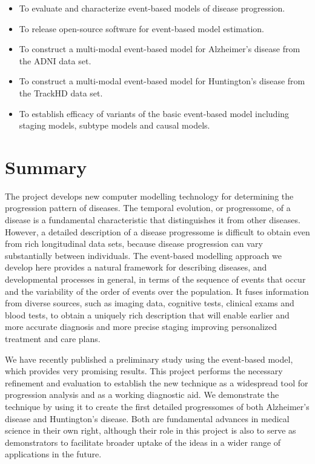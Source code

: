 \documentclass[a4paper,11pt]{article}
\begin{document}
\begin{itemize}

\item To evaluate and characterize event-based models of disease
progression.

\item To release open-source software for event-based model estimation.

\item To construct a multi-modal event-based model for
Alzheimer's disease from the ADNI data set.

\item To construct a multi-modal event-based model for
Huntington's disease from the TrackHD data set.

\item To establish efficacy of variants of the basic event-based model
including staging models, subtype models and causal models.

\end{itemize}


\section*{Summary}

The project develops new computer modelling technology for determining
the progression pattern of diseases.  The temporal evolution, or
progressome, of a disease is a fundamental characteristic that
distinguishes it from other diseases.  However, a detailed description
of a disease progressome is difficult to obtain even from rich
longitudinal data sets, because disease progression can vary
substantially between individuals.  The event-based modelling approach
we develop here provides a natural framework for describing diseases,
and developmental processes in general, in terms of the sequence of
events that occur and the variability of the order of events over the
population.  It fuses information from diverse sources, such as
imaging data, cognitive tests, clinical exams and blood tests, to
obtain a uniquely rich description that will enable earlier and more
accurate diagnosis and more precise staging improving personalized
treatment and care plans.

We have recently published a preliminary study using the event-based
model, which provides very promising results.  This project performs
the necessary refinement and evaluation to establish the new technique
as a widespread tool for progression analysis and as a working
diagnostic aid.  We demonstrate the technique by using it to create
the first detailed progressomes of both Alzheimer's disease and
Huntington's disease.  Both are fundamental advances in medical
science in their own right, although their role in this project is
also to serve as demonstrators to facilitate broader uptake of the
ideas in a wider range of applications in the future.
\end{document}
